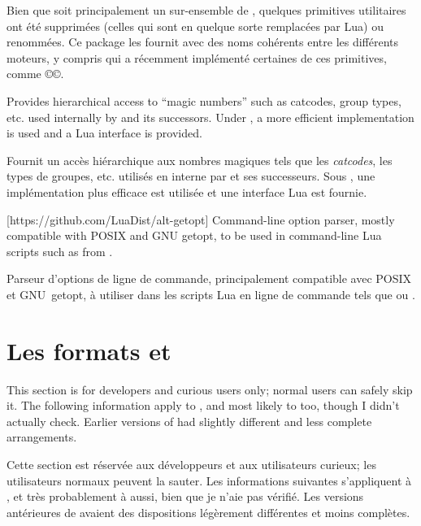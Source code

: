 \documentclass{lltxdoc}
\begin{document}
{Bien que \luatex soit principalement un sur-ensemble de \pdftex, quelques primitives utilitaires ont été supprimées (celles qui sont en quelque sorte remplacées par Lua) ou renommées. Ce package les fournit avec des noms cohérents entre les différents moteurs, y compris \xetex qui a récemment implémenté certaines de ces primitives, comme ©\strcmp©.
%

Provides hierarchical access to ``magic numbers'' such as catcodes, group
types, etc. used internally by \tex and its successors. Under \luatex, a more
efficient implementation is used and a Lua interface is provided.

Fournit un accès hiérarchique aux \og{}nombres magiques\fg{} tels que les \emph{catcodes}, les types de groupes, etc. utilisés en interne par \tex et ses successeurs. Sous \luatex, une implémentation plus efficace est utilisée et une interface Lua est fournie.

[https://github.com/LuaDist/alt-getopt]
Command-line option parser, mostly compatible with POSIX and GNU getopt, to be
used in command-line Lua scripts such as  from
.

Parseur d'options de ligne de commande, principalement compatible avec POSIX et GNU~getopt, à utiliser dans les scripts Lua en ligne de commande tels que  ou .

\section{Les formats  et }\label{formats}

This section is for developers and curious users only; normal users can safely
skip it. The following information apply to , and most likely to
 too, though I didn't actually check. Earlier versions of \texlive
had slightly different and less complete arrangements.

Cette section est réservée aux développeurs et aux utilisateurs curieux; les utilisateurs normaux peuvent la sauter. Les informations suivantes s'appliquent à , et très probablement à  aussi, bien que je n'aie pas vérifié. Les versions antérieures de \texlive avaient des dispositions légèrement différentes et moins complètes.

}
\end{document}
